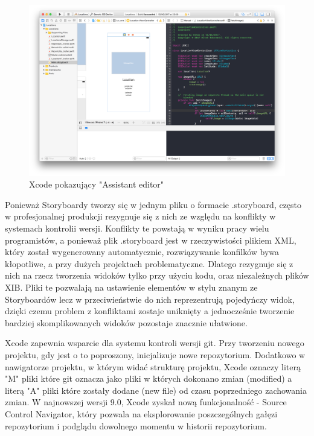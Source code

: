 \begin{figure}[ht!]
  \centering
  \includegraphics[width=120mm]{images/chapter-2-image-2-xcode.png}
  \caption{Xcode pokazujący "Assistant editor"}
  \label{overflow}
\end{figure}

Ponieważ Storyboardy tworzy się w jednym pliku o formacie .storyboard, często w profesjonalnej produkcji rezygnuje się z nich ze
względu na konflikty w systemach kontrolii wersji. Konflikty te powstają w wyniku pracy wielu programistów, a ponieważ plik .storyboard
jest w rzeczywistości plikiem XML, który został wygenerowany automatycznie, rozwiązywanie konfilków bywa kłopotliwe, a przy dużych
projektach problematyczne. Dlatego rezygnuje się z nich na rzecz tworzenia widoków tylko przy użyciu kodu, oraz niezależnych plików XIB.
Pliki te pozwalają na ustawienie elementów w stylu znanym ze Storyboardów lecz w przeciwieństwie do nich reprezentrują pojedyńczy widok,
dzięki czemu problem z konfliktami zostaje uniknięty a jednocześnie tworzenie bardziej skomplikowanych widoków pozostaje znacznie
ułatwione.

Xcode zapewnia wsparcie dla systemu kontroli wersji git. Przy tworzeniu nowego projektu, gdy jest o to poproszony, inicjalizuje nowe
repozytorium. Dodatkowo w nawigatorze projektu, w którym widać strukturę projektu, Xcode oznaczy literą "M" pliki które git oznacza
jako pliki w których dokonano zmian (modified) a literą "A" pliki które zostały dodane (new file) od czasu poprzedniego zachowania zmian.
W najnowszej wersji 9.0, Xcode zyskał nową funkcjonalność - Source Control Navigator, który pozwala na eksplorowanie poszczególnych
gałęzi repozytorium i podglądu dowolnego momentu w historii repozytorium.

